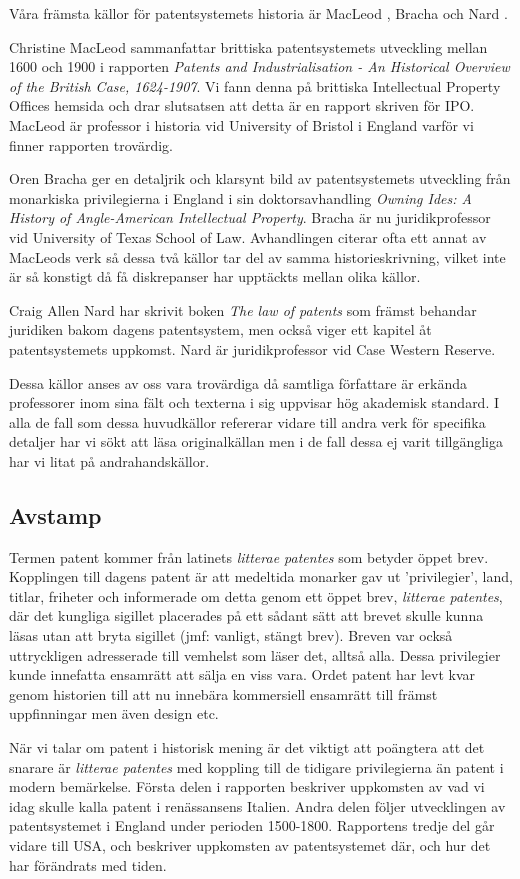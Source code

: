 Våra främsta källor för patentsystemets historia är MacLeod \cite{macleod},
Bracha \cite{bracha} och Nard \cite{nard}.

Christine MacLeod sammanfattar brittiska patentsystemets utveckling mellan 
1600 och 1900 i rapporten \emph{Patents and Industrialisation - An Historical 
Overview of the British Case, 1624-1907}. Vi fann denna på brittiska 
Intellectual Property Offices hemsida och drar slutsatsen att detta är en 
rapport skriven för IPO. MacLeod är professor i historia vid University of 
Bristol i England varför vi finner rapporten trovärdig.

Oren Bracha ger en detaljrik och klarsynt bild av patentsystemets utveckling 
från monarkiska privilegierna i England i sin doktorsavhandling \emph{Owning 
Ides: A History of Angle-American Intellectual Property}. Bracha är nu 
juridikprofessor vid University of Texas School of Law. Avhandlingen citerar 
ofta ett annat av MacLeods verk så dessa två källor tar del av samma 
historieskrivning, vilket inte är så konstigt då få diskrepanser har upptäckts 
mellan olika källor.

Craig Allen Nard har skrivit boken \emph{The law of patents} som främst 
behandar juridiken bakom dagens patentsystem, men också viger ett kapitel åt 
patentsystemets uppkomst. Nard är juridikprofessor vid Case Western Reserve.

Dessa källor anses av oss vara trovärdiga då samtliga författare är erkända 
professorer inom sina fält och texterna i sig uppvisar hög akademisk standard. 
I alla de fall som dessa huvudkällor refererar vidare till andra verk för 
specifika detaljer har vi sökt att läsa originalkällan men i de fall dessa ej 
varit tillgängliga har vi litat på andrahandskällor.


\subsection{Avstamp}

Termen patent kommer från latinets \emph{litterae patentes} som
betyder öppet brev. Kopplingen till dagens patent är att medeltida monarker gav
ut 'privilegier', land, titlar, friheter och informerade om detta genom ett
öppet brev, \emph{litterae patentes}, där det kungliga sigillet placerades på
ett sådant sätt att brevet skulle kunna läsas utan att bryta sigillet (jmf: 
vanligt, stängt brev). Breven var också uttryckligen adresserade till 
vemhelst som läser det, alltså alla. Dessa privilegier kunde innefatta ensamrätt
att sälja en viss vara. Ordet patent har levt kvar genom historien till 
att nu innebära kommersiell ensamrätt till främst uppfinningar men även 
design etc. \cite{blackstone vad hänvisas?}

När vi talar om patent i historisk mening är det viktigt att poängtera att det 
snarare är \emph{litterae patentes} med koppling till de tidigare 
privilegierna än patent i modern bemärkelse. Första delen i rapporten beskriver
uppkomsten av vad vi idag skulle kalla patent i renässansens Italien.
Andra delen följer utvecklingen av patentsystemet i England under perioden
1500-1800. Rapportens tredje del går vidare till USA, och beskriver uppkomsten
av patentsystemet där, och hur det har förändrats med tiden. 


